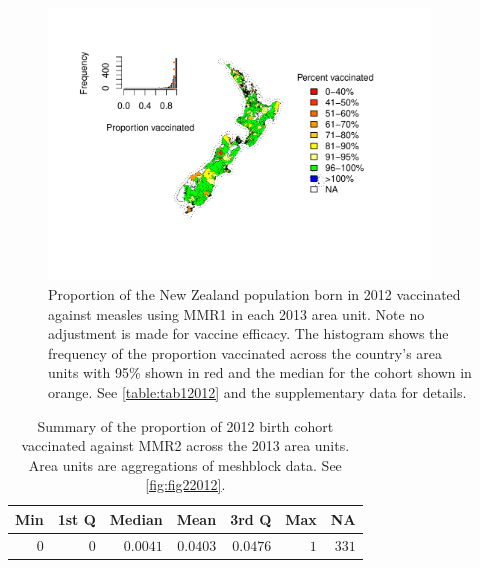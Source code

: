 \documentclass{article}
\begin{document}
\begin{figure}
\begin{center}
    \includegraphics[width=0.9\textwidth]{nir_census_MMR1_NIR_2012.pdf}
 \end{center}
    \caption{Proportion of the New Zealand population born in 2012 vaccinated against measles using MMR1 in each 2013 area unit. Note no adjustment is made for vaccine efficacy. The histogram shows the frequency of the proportion vaccinated across the country's area units with 95\% shown in red and the median for the cohort shown in orange. See \autoref{table:tab12012} and the supplementary data for details.}
\label{fig:fig12012}
\end{figure}

 \vspace{5mm} %
\begin{table}
\begin{center}
\begin{tabular}{rrrrrrr}
\hline\hline
\multicolumn{1}{c}{Min}&\multicolumn{1}{c}{1st Q}&\multicolumn{1}{c}{Median}&\multicolumn{1}{c}{Mean}&\multicolumn{1}{c}{3rd Q}&\multicolumn{1}{c}{Max}&\multicolumn{1}{c}{NA}\tabularnewline
\hline
$0$&$0$&$0.0041$&$0.0403$&$0.0476$&$1$&$331$\tabularnewline
\hline
\end{tabular}\end{center}\caption{Summary of the proportion of 2012 birth cohort vaccinated against MMR2 across the 2013 area units. Area units are aggregations of meshblock data. See \autoref{fig:fig22012}.}
\label{table:tab22012}
\end{table}
\end{document}
